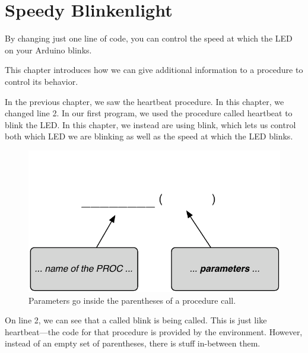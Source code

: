 \chapter{Speedy Blinkenlight}
By changing just one line of code, you can control the speed at which the LED on your Arduino blinks.

\GOALS
This chapter introduces how we can give additional information to a procedure to control its behavior. 

\CODE



\PATTERNS
In the previous chapter, we saw the {\code heartbeat} procedure. In this chapter, we changed line 2. In our first program, we used the \plumbing procedure called {\code heartbeat} to blink the LED. In this chapter, we instead are using {\code blink}, which lets us control both which LED we are blinking as well as the speed at which the LED blinks.

\begin{figure}[h]
  \begin{center}
    \includegraphics[width=\linewidth]{images/parameter-pattern}
    \caption{Parameters go inside the parentheses of a procedure call.}
    \label{pattern:parameters}
  \end{center}
\end{figure}

On line 2, we can see that a \PROCedure called {\code blink} is being called. This is just like {\code heartbeat}---the code for that procedure is provided by the \plumbing environment. However, instead of an empty set of parentheses, there is stuff in-between them. 

